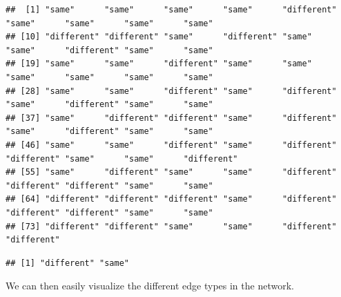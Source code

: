 \documentclass[
]{book}
\newenvironment{Shaded}{\begin{snugshade}}{\end{snugshade}}
\newcommand{\AttributeTok}[1]{\textcolor[rgb]{0.13,0.29,0.53}{#1}}
\newcommand{\CommentTok}[1]{\textcolor[rgb]{0.56,0.35,0.01}{\textit{#1}}}
\newcommand{\FunctionTok}[1]{\textcolor[rgb]{0.13,0.29,0.53}{\textbf{#1}}}
\newcommand{\NormalTok}[1]{#1}
\newcommand{\SpecialCharTok}[1]{\textcolor[rgb]{0.81,0.36,0.00}{\textbf{#1}}}
\newcommand{\StringTok}[1]{\textcolor[rgb]{0.31,0.60,0.02}{#1}}
\begin{document}
\begin{Shaded}
\end{Shaded}

\begin{verbatim}
##  [1] "same"      "same"      "same"      "same"      "different" "same"      "same"      "same"      "same"     
## [10] "different" "different" "same"      "different" "same"      "same"      "different" "same"      "same"     
## [19] "same"      "same"      "different" "same"      "same"      "same"      "same"      "same"      "same"     
## [28] "same"      "same"      "different" "same"      "different" "same"      "different" "same"      "same"     
## [37] "same"      "different" "different" "same"      "different" "same"      "different" "same"      "same"     
## [46] "same"      "same"      "different" "same"      "different" "different" "same"      "same"      "different"
## [55] "same"      "different" "same"      "same"      "different" "different" "different" "same"      "same"     
## [64] "different" "different" "different" "same"      "different" "different" "different" "same"      "same"     
## [73] "different" "different" "same"      "same"      "different" "different"
\end{verbatim}

\begin{Shaded}
\end{Shaded}

\begin{verbatim}
## [1] "different" "same"
\end{verbatim}

We can then easily visualize the different edge types in the network.

\begin{Shaded}
\end{Shaded}
\end{document}
